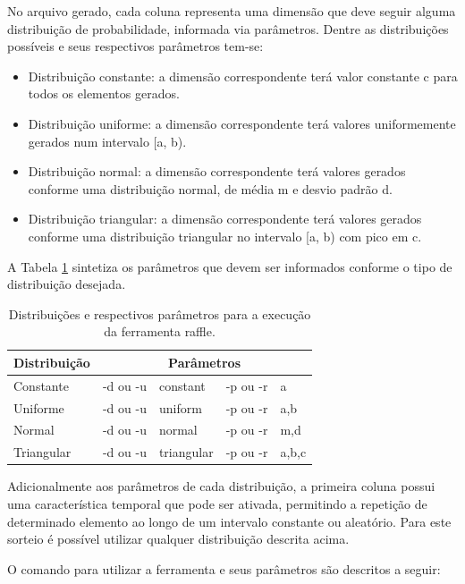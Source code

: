 No arquivo gerado, cada coluna representa uma dimensão que deve seguir alguma distribuição de probabilidade, informada via parâmetros. Dentre as distribuições possíveis e seus respectivos parâmetros tem-se: 

\begin{itemize}
	\item Distribuição constante: a dimensão correspondente terá valor constante c para todos os elementos gerados.
	\item Distribuição uniforme: a dimensão correspondente terá valores uniformemente gerados num intervalo [a, b).
	\item Distribuição normal: a dimensão correspondente terá valores gerados conforme uma distribuição normal, de média m e desvio padrão d.
	\item Distribuição triangular: a dimensão correspondente terá valores gerados conforme uma distribuição triangular no intervalo [a, b) com pico em c.
\end{itemize}

A Tabela \ref{tab:distparam} sintetiza os parâmetros que devem ser informados conforme o tipo de distribuição desejada.

\begin{table}[!h]
	\centering
	\caption{Distribuições e respectivos parâmetros para a execução da ferramenta raffle.}
	\label{tab:distparam}
	\begin{tabular}{l|l|l|l|l}
		\hline
		Distribuição & \multicolumn{4}{c}{Parâmetros} \\
		\hline
		Constante  & -d ou -u & constant   & -p ou -r & a \\
		Uniforme   & -d ou -u & uniform	   & -p ou -r & a,b \\
		Normal     & -d ou -u & normal	   & -p ou -r & m,d \\
		Triangular & -d ou -u & triangular & -p ou -r & a,b,c \\
		\hline
	\end{tabular}
\end{table}

Adicionalmente aos parâmetros de cada distribuição, a primeira coluna possui uma característica temporal que pode ser ativada, permitindo a repetição de determinado elemento ao longo de um intervalo constante ou aleatório. Para este sorteio é possível utilizar qualquer distribuição descrita acima.

O comando para utilizar a ferramenta e seus parâmetros são descritos a seguir:

